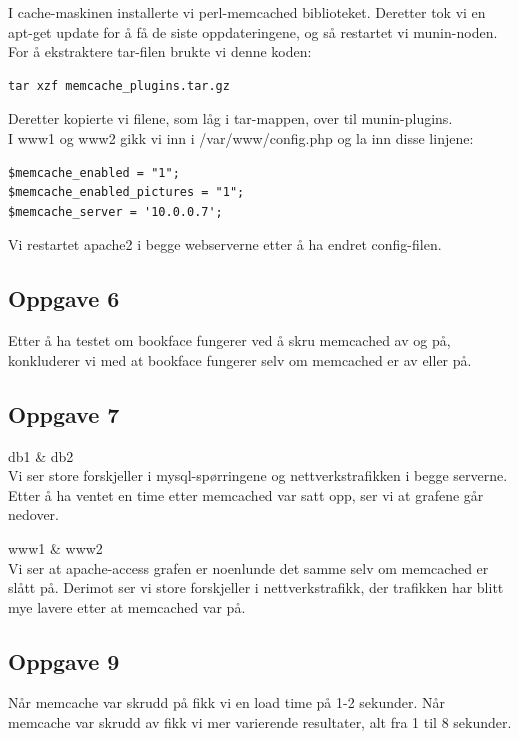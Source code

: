 \documentclass[a4paper, norsk, 12pt]{article}
\begin{document}
I cache-maskinen installerte vi perl-memcached biblioteket. Deretter tok vi en apt-get update for å få de siste oppdateringene, og så restartet vi munin-noden.\\

For å ekstraktere tar-filen brukte vi denne koden:

\begin{verbatim}
tar xzf memcache_plugins.tar.gz
\end{verbatim}

Deretter kopierte vi filene, som låg i tar-mappen, over til munin-plugins.\\

I www1 og www2 gikk vi inn i /var/www/config.php og la inn disse linjene: 
\begin{verbatim}
$memcache_enabled = "1";
$memcache_enabled_pictures = "1";
$memcache_server = '10.0.0.7';
\end{verbatim}

Vi restartet apache2 i begge webserverne etter å ha endret config-filen.

\subsection{Oppgave 6}
Etter å ha testet om bookface fungerer ved å skru memcached av og på, konkluderer vi med at bookface fungerer selv om memcached er av eller på.

\subsection{Oppgave 7}
db1 \& db2
\\
Vi ser store forskjeller i mysql-spørringene og nettverkstrafikken i begge serverne. Etter å ha ventet en time etter memcached var satt opp, ser vi at grafene går nedover. 

www1 \& www2
\\
Vi ser at apache-access grafen er noenlunde det samme selv om memcached er slått på. Derimot ser vi store forskjeller i nettverkstrafikk, der trafikken har blitt mye lavere etter at memcached var på.

\subsection{Oppgave 9}
Når memcache var skrudd på fikk vi en load time på 1-2 sekunder.
Når memcache var skrudd av fikk vi mer varierende resultater, alt fra 1 til 8 sekunder.\\
\end{document}
